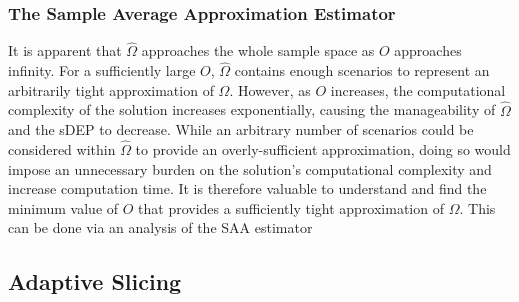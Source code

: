 \documentclass[12pt,dvipsnames]{report}
\begin{document}
\subsubsection{The Sample Average Approximation Estimator} \label{subsubsec:dep_sampling_estimator}

%
It is apparent that $\hat{\Omega}$ approaches the whole sample space as $O$ approaches infinity.  For a sufficiently large $O$, $\hat{\Omega}$ contains enough scenarios to represent an arbitrarily tight approximation of $\Omega$.  However, as $O$ increases, the computational complexity of the solution increases exponentially, causing the manageability of $\hat{\Omega}$ and the sDEP to decrease.  While an arbitrary number of scenarios could be considered within $\hat{\Omega}$ to provide an overly-sufficient approximation, doing so would impose an unnecessary burden on the solution's computational complexity and increase computation time.  It is therefore valuable to understand and find the minimum value of $O$ that provides a sufficiently tight approximation of $\Omega$.  This can be done via an analysis of the SAA estimator


\subsection{Adaptive Slicing} \label{subsec:dep_slicing}

\end{document}
